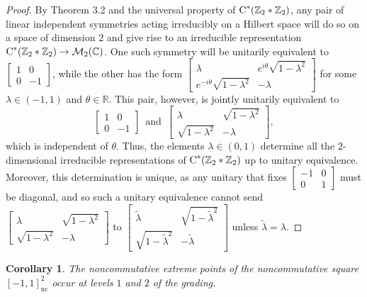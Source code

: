 \documentclass{amsart}
\newtheorem{corollary}[theorem]{Corollary}
\theoremstyle{definition}
\theoremstyle{remark}
\newcommand{\M}{\mathcal{M}}
\newcommand\cstar{{\textrm C}^*}                              %
\numberwithin{equation}{section}
\begin{document}
\begin{proof} By Theorem 3.2 and
the universal property of $\cstar(\mathbb Z_2* \mathbb Z_2)$, any pair of linear independent symmetries acting irreducibly on a Hilbert space will do so
on a space of dimension 2 and give rise to an irreducible representation $\cstar(\mathbb Z_2* \mathbb Z_2)\rightarrow\M_2(\mathbb C)$. One such symmetry
will be unitarily equivalent to $\left[ \begin{array}{cc}1 &0 \\ 0 & -1\end{array}\right]$, while the other has the form 
$\left[ \begin{array}{cc}\lambda &e^{i\theta}\sqrt{1-\lambda^2} \\ e^{-i\theta}\sqrt{1-\lambda^2} & -\lambda\end{array}\right]$ for some 
$\lambda\in(-1,1)$ and $\theta\in\mathbb R$. This pair, however, is jointly 
unitarily equivalent to
	\[
	\left[ \begin{array}{cc}1 &0 \\ 0 & -1\end{array}\right]\,\mbox{ and }\,
	\left[ \begin{array}{cc}\lambda &\sqrt{1-\lambda^2} \\ \sqrt{1-\lambda^2} & -\lambda\end{array}\right],
	\]
which is independent of $\theta$. Thus, the elements $\lambda\in(0,1)$ determine all the $2$-dimensional irreducible representations of
$\cstar(\mathbb Z_2* \mathbb Z_2)$ up to unitary equivalence. Moreover, this determination is unique, as
any unitary that fixes 
	$\left[ \begin{array}{cc} -1 &0 \\ 0 & 1\end{array}\right]$ must be diagonal, and so such a unitary equivalence cannot send 
	$\left[ \begin{array}{cc}\lambda &\sqrt{1-\lambda^2} \\ \sqrt{1-\lambda^2} & -\lambda\end{array}\right]$ to  
	$\left[ \begin{array}{cc}\tilde\lambda &\sqrt{1-\tilde\lambda^2} \\ \sqrt{1-\tilde\lambda^2} & -\tilde\lambda\end{array}\right]$
	unless $\tilde\lambda=\lambda$.
\end{proof} 

\begin{corollary} The noncommutative extreme points of the noncommutative square $[-1,1]^2_{\textrm{nc}}$
occur at levels $1$ and $2$ of the grading.
\end{corollary}
\end{document}
